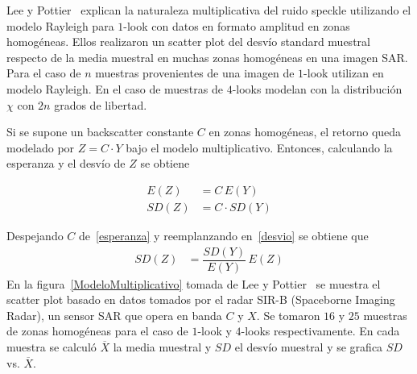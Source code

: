 %


Lee y Pottier~\cite{Lee2009} explican la naturaleza multiplicativa del ruido speckle utilizando el modelo Rayleigh para $1$-look con datos en formato amplitud en zonas homogéneas. Ellos realizaron un scatter plot del desvío standard muestral respecto de la media muestral en muchas zonas homogéneas en una imagen SAR. Para el caso de $n$ muestras provenientes de una imagen de $1$-look utilizan en modelo Rayleigh. En el caso de muestras de $4$-looks modelan con la distribución $\chi$ con $2n$ grados de libertad.

Si se supone un backscatter constante $C$ en zonas homogéneas, el retorno queda modelado por $Z=C \cdot Y$ bajo el modelo multiplicativo. Entonces, calculando la esperanza y el desvío de $Z$ se obtiene

\begin{align}
E(Z)&=C \, E(Y)\label{esperanza}\\
SD(Z)&=C \cdot SD(Y)\label{desvio}
\end{align} 

Despejando $C$ de~\eqref{esperanza} y reemplanzando en~\eqref{desvio} se obtiene que
\begin{align}
SD(Z)&= \dfrac{SD(Y)}{E(Y)} \, E(Z)\label{desvio}
\end{align} 
En la figura~\ref{ModeloMultiplicativo} tomada de Lee y Pottier~\cite{Lee2009} se muestra el scatter plot basado en datos tomados por el radar SIR-B (Spaceborne Imaging Radar), un sensor SAR que opera en banda $C$ y $X$. Se tomaron $16$ y $25$ muestras de zonas homogéneas para el caso de $1$-look y $4$-looks respectivamente. En cada muestra se calculó $\overline{X}$ la media muestral y $SD$ el desvío muestral y se grafica $SD$ vs. $\overline{X}.$


